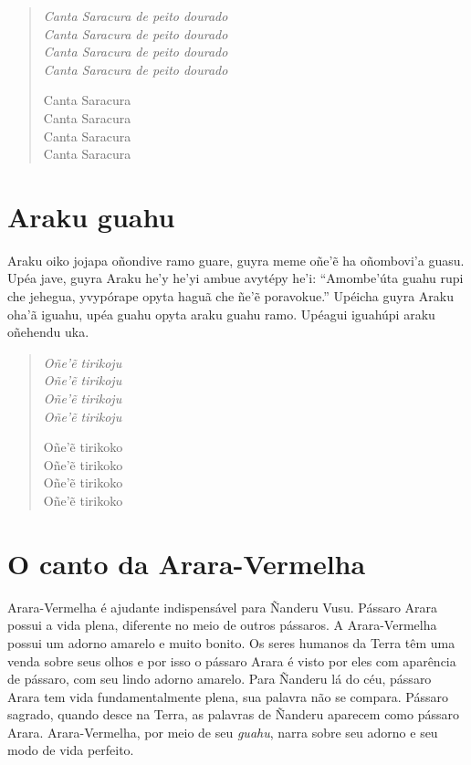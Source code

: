 \begin{verse}
\itshape
Canta Saracura de peito dourado\\
Canta Saracura de peito dourado\\
Canta Saracura de peito dourado\\
Canta Saracura de peito dourado

Canta Saracura\\
Canta Saracura\\
Canta Saracura\\
Canta Saracura
\end{verse}

\chapter{Araku guahu}

 Araku oiko jojapa oñondive ramo guare, guyra meme oñe'ẽ ha
oñombovi'a guasu. Upéa jave, guyra Araku he'y he'yi ambue avytépy he'i:
``Amombe'úta guahu rupi che jehegua, yvypórape opyta haguã che ñe'ẽ
poravokue.'' Upéicha guyra Araku oha'ã iguahu, upéa guahu opyta araku
guahu ramo. Upéagui iguahúpi araku oñehendu uka.

\begin{verse}
\itshape
Oñe'ẽ tirikoju\\
Oñe'ẽ tirikoju\\
Oñe'ẽ tirikoju\\
Oñe'ẽ tirikoju

Oñe'ẽ tirikoko\\
Oñe'ẽ tirikoko\\
Oñe'ẽ tirikoko\\
Oñe'ẽ tirikoko
\end{verse}

\chapter{O canto da Arara-Vermelha}

Arara-Vermelha é ajudante indispensável para Ñanderu Vusu. Pássaro
Arara possui a vida plena, diferente no meio de outros pássaros. A
Arara-Vermelha possui um adorno amarelo e muito bonito. Os seres humanos da Terra têm uma venda sobre seus olhos e por isso o pássaro Arara é visto por eles com aparência de pássaro, com seu lindo adorno amarelo. Para Ñanderu lá do céu, pássaro Arara tem vida
fundamentalmente plena, sua palavra não se compara. Pássaro sagrado,
quando desce na Terra, as palavras de Ñanderu aparecem como pássaro
Arara. Arara-Vermelha, por meio de seu \emph{guahu}, narra sobre seu
adorno e seu modo de vida perfeito.

